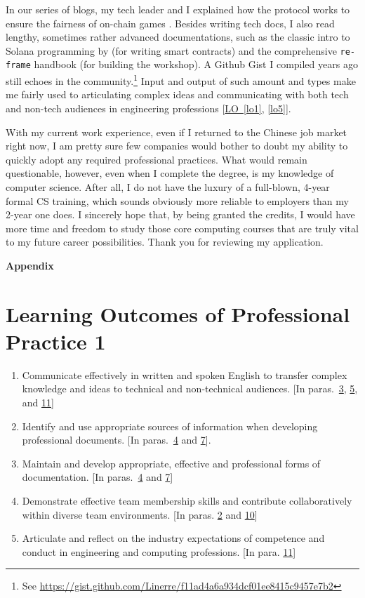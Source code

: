 \documentclass[12pt,a4paper]{article}
\renewcommand{\appendixpagename}{\centerline{{\Large\bfseries Appendix}}}
\newcommand{\refpp}[1]{\hyperref[#1]{LO~\ref{#1}}}
\newcommand{\refpa}[1]{\hyperlink{para#1}{#1}}
\begin{document}
\hypertarget{para11}{}
In our series of blogs, my tech leader and I explained how the protocol works to ensure the fairness of on-chain games \citep{race2022}.  Besides writing tech docs,  I also read lengthy, sometimes rather advanced documentations, such as the classic intro to Solana programming by \citet*{paulx2021} (for writing smart contracts) and the comprehensive \texttt{re-frame} handbook \citep{day8} (for building the workshop).  A Github Gist I compiled years ago still echoes in the community.\footnote{See \url{https://gist.github.com/Linerre/f11ad4a6a934dcf01ee8415c9457e7b2}}  Input and output of such amount and types make me fairly used to articulating complex ideas  and communicating with both tech and non-tech audiences in engineering professions [\refpp{lo1}, \ref{lo5}].

With my current work experience, even if I returned to the Chinese job market right now, I am pretty sure few companies would bother to doubt my ability to quickly adopt any required professional practices.  What would remain questionable, however, even when I complete the degree, is my knowledge of computer science.  After all, I do not have the luxury of a full-blown, 4-year formal CS training, which sounds obviously more reliable to employers than my 2-year one does.  I sincerely hope that, by being granted the credits, I would have more time and freedom to study those core computing courses that are truly vital to my future career possibilities.  Thank you for reviewing my application.




\clearpage
\appendixpagename
\setcounter{section}{0}%
\renewcommand{\thesection}{\Alph{section}}%
\section*{Learning Outcomes of Professional Practice 1}
\begin{enumerate}
\item\label{lo1} Communicate effectively in written and spoken English to transfer complex knowledge and ideas to technical and non-technical audiences. [In paras.~\refpa{3}, \refpa{5}, and \refpa{11}]
\item\label{lo2} Identify and use appropriate sources of information when developing professional documents.  [In paras.~\refpa{4} and \refpa{7}].
\item\label{lo3} Maintain and develop appropriate, effective and professional forms of documentation.  [In paras.~\refpa{4} and \refpa{7}]
\item\label{lo4} Demonstrate effective team membership skills and contribute collaboratively within diverse team environments.  [In paras. \refpa{2} and \refpa{10}]
\item\label{lo5} Articulate and reflect on the industry expectations of competence and conduct in engineering and computing professions.  [In para. \refpa{11}]
\end{enumerate}
\end{document}
